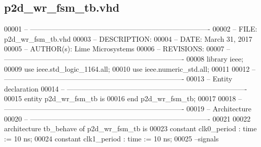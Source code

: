 \subsection{p2d\+\_\+wr\+\_\+fsm\+\_\+tb.\+vhd}
\label{p2d__wr__fsm__tb_8vhd_source}

\begin{DoxyCode}
00001 \textcolor{keyword}{-- ---------------------------------------------------------------------------- }
00002 \textcolor{keyword}{-- FILE:    p2d\_wr\_fsm\_tb.vhd}
00003 \textcolor{keyword}{-- DESCRIPTION: }
00004 \textcolor{keyword}{-- DATE:    March 31, 2017}
00005 \textcolor{keyword}{-- AUTHOR(s):   Lime Microsystems}
00006 \textcolor{keyword}{-- REVISIONS:}
00007 \textcolor{keyword}{-- ---------------------------------------------------------------------------- }
00008 \textcolor{vhdlkeyword}{library }\textcolor{keywordflow}{ieee};
00009 \textcolor{vhdlkeyword}{use }ieee.std\_logic\_1164.\textcolor{keywordflow}{all};
00010 \textcolor{vhdlkeyword}{use }ieee.numeric\_std.\textcolor{keywordflow}{all};
00011 
00012 \textcolor{keyword}{-- ----------------------------------------------------------------------------}
00013 \textcolor{keyword}{-- Entity declaration}
00014 \textcolor{keyword}{-- ----------------------------------------------------------------------------}
00015 \textcolor{keywordflow}{entity }p2d_wr_fsm_tb \textcolor{keywordflow}{is}
00016 \textcolor{keywordflow}{end} \textcolor{vhdlchar}{p2d\_wr\_fsm\_tb};
00017 
00018 \textcolor{keyword}{-- ----------------------------------------------------------------------------}
00019 \textcolor{keyword}{-- Architecture}
00020 \textcolor{keyword}{-- ----------------------------------------------------------------------------}
00021 
00022 \textcolor{keywordflow}{architecture} tb\_behave \textcolor{keywordflow}{of} p2d_wr_fsm_tb is
00023 \textcolor{keywordflow}{constant} \textcolor{vhdlchar}{clk0_period}   \textcolor{vhdlchar}{:} \textcolor{comment}{time} \textcolor{vhdlchar}{:=} \textcolor{vhdllogic}{}\textcolor{vhdllogic}{10} \textcolor{vhdlchar}{ns};
00024 \textcolor{keywordflow}{constant} \textcolor{vhdlchar}{clk1_period}   \textcolor{vhdlchar}{:} \textcolor{comment}{time} \textcolor{vhdlchar}{:=} \textcolor{vhdllogic}{}\textcolor{vhdllogic}{10} \textcolor{vhdlchar}{ns}; 
00025 \textcolor{keyword}{   --signals}

\end{DoxyCode}
